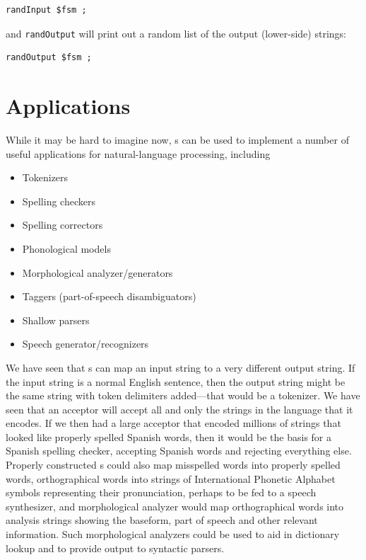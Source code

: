 \begin{Verbatim}
randInput $fsm ;
\end{Verbatim}

\noindent
and \texttt{randOutput} will print out a random list of the output (lower-side) strings:

\begin{Verbatim}
randOutput $fsm ;
\end{Verbatim}

\section{Applications}

While it may be hard to imagine now, \fsm{}s can be used to implement a number of useful
applications for natural-language processing, including

\begin{itemize}
\item
Tokenizers
\item
Spelling checkers
\item
Spelling correctors
\item
Phonological models
\item
Morphological analyzer/generators
\item
Taggers (part-of-speech disambiguators)
\item
Shallow parsers
\item
Speech generator/recognizers
\end{itemize}

We have seen that \fst{}s can map an input string to a very different output string.  If
the input string is a normal English sentence, then the output string might be the same
string with token delimiters added---that would be a tokenizer.  We have seen that an
acceptor will accept all and only the strings in the language that it encodes.  If we then
had a large acceptor that encoded millions of strings that looked like properly spelled Spanish words, then
it would be the basis for a Spanish spelling checker, accepting Spanish words and rejecting
everything else.  Properly constructed \fst{}s could also map misspelled words into properly
spelled words, orthographical words into
strings of International Phonetic Alphabet symbols representing their pronunciation,
perhaps to be fed to a speech synthesizer, and
morphological analyzer  would map orthographical words into analysis strings showing
the baseform, part of speech and other relevant information.  Such morphological analyzers
could be used to aid in dictionary lookup and to provide output to syntactic parsers.

